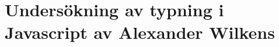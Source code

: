 \chapter{Undersökning av typning i Javascript av Alexander Wilkens}
\label{individual:alexander}







